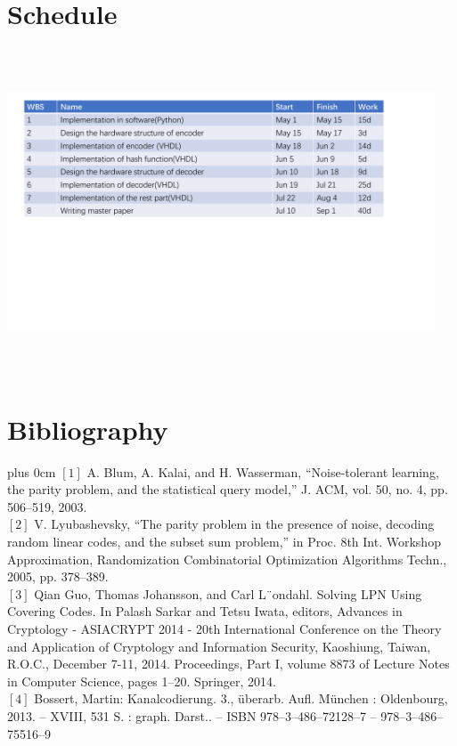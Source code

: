 \documentclass{beamer}
\begin{document}
\section{Schedule}
\begin{outlineframe}
	\tableofcontents[currentsection]
\end{outlineframe}
\begin{frame}
	\vspace{0.3cm}
	\centering
	\includegraphics[width=5in,height=3.8in]{Schedule.pdf}
\end{frame}	



\section{Bibliography}
\begin{outlineframe}
	\tableofcontents[currentsection]
\end{outlineframe}
\begin{bibliographyframe}
	{\leftskip=0pt \rightskip=0pt plus 0cm
	\small{
$[1]$ A. Blum, A. Kalai, and H. Wasserman, “Noise-tolerant learning, the parity problem, and the statistical query model,” J. ACM, vol. 50, no. 4, pp. 506–519, 2003.\\
$[2]$ V. Lyubashevsky, “The parity problem in the presence of noise, decoding random linear codes, and the subset sum problem,” in Proc. 8th Int. Workshop Approximation, Randomization Combinatorial Optimization Algorithms Techn., 2005, pp. 378–389.\\
$[3]$ Qian Guo, Thomas Johansson, and Carl L¨ondahl. Solving LPN Using Covering Codes. In Palash Sarkar and Tetsu Iwata, editors, Advances in Cryptology - ASIACRYPT 2014 - 20th International Conference on the Theory and Application of Cryptology and Information Security, Kaoshiung, Taiwan, R.O.C., December 7-11, 2014. Proceedings, Part I, volume 8873 of Lecture Notes in Computer Science, pages 1–20. Springer, 2014.\\
$[4]$ Bossert, Martin: Kanalcodierung. 3., überarb. Aufl. München : Oldenbourg, 2013. – XVIII, 531 S. : graph. Darst.. – ISBN 978–3–486–72128–7 – 978–3–486–75516–9 \\
}
}
\end{bibliographyframe}
\end{document}
